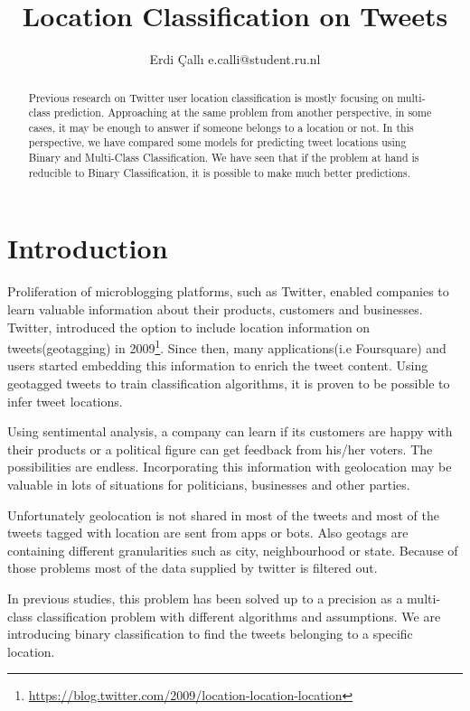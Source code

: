 \documentclass[twoside,11pt]{article}
\begin{document}
\title{Location Classification on Tweets}
\author{\name Erdi \c{C}all{\i}  \email e.calli@student.ru.nl}
\maketitle
\begin{abstract}
Previous research on Twitter user location classification is mostly focusing on multi-class prediction. Approaching at the same problem from another perspective, in some cases, it may be enough to answer if someone belongs to a location or not. In this perspective, we have compared some models for predicting tweet locations using Binary and Multi-Class Classification. We have seen that if the problem at hand is reducible to Binary Classification, it is possible to make much better predictions.
\end{abstract}


\section{Introduction}

Proliferation of microblogging platforms, such as Twitter, enabled companies to learn valuable information about their products, customers and businesses. Twitter, introduced the option to include location information on tweets(geotagging) in 2009\footnote{\url{https://blog.twitter.com/2009/location-location-location}}. Since then, many applications(i.e Foursquare) and users started embedding this information to enrich the tweet content. Using geotagged tweets to train classification algorithms, it is proven to be possible to infer tweet locations\cite{cheng2010you}.

Using sentimental analysis\cite{pak2010twitter}, a company can learn if its customers are happy with their products or a political figure can get feedback from his/her voters. The possibilities are endless. Incorporating this information with geolocation may be valuable in lots of situations for politicians, businesses and other parties.

Unfortunately geolocation is not shared in most of the tweets and most of the tweets tagged with location are sent from apps or bots. Also geotags are containing different granularities such as city, neighbourhood or state. Because of those problems most of the data supplied by twitter is filtered out.

In previous studies, this problem has been solved up to a precision as a multi-class classification problem with different algorithms and assumptions. We are introducing binary classification to find the tweets belonging to a specific location.
\end{document}
